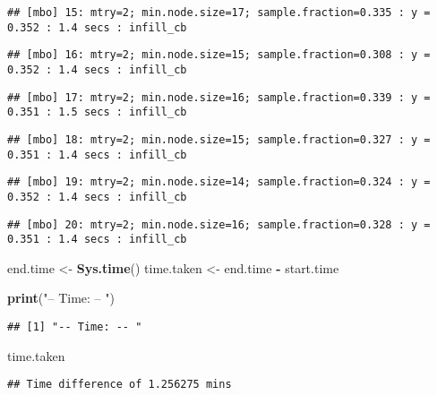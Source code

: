 \documentclass[
]{article}
\newenvironment{Shaded}{\begin{snugshade}}{\end{snugshade}}
\newcommand{\KeywordTok}[1]{\textcolor[rgb]{0.13,0.29,0.53}{\textbf{#1}}}
\newcommand{\NormalTok}[1]{#1}
\newcommand{\OperatorTok}[1]{\textcolor[rgb]{0.81,0.36,0.00}{\textbf{#1}}}
\newcommand{\StringTok}[1]{\textcolor[rgb]{0.31,0.60,0.02}{#1}}
\begin{document}
\begin{verbatim}
## [mbo] 15: mtry=2; min.node.size=17; sample.fraction=0.335 : y = 0.352 : 1.4 secs : infill_cb
\end{verbatim}

\begin{verbatim}
## [mbo] 16: mtry=2; min.node.size=15; sample.fraction=0.308 : y = 0.352 : 1.4 secs : infill_cb
\end{verbatim}

\begin{verbatim}
## [mbo] 17: mtry=2; min.node.size=16; sample.fraction=0.339 : y = 0.351 : 1.5 secs : infill_cb
\end{verbatim}

\begin{verbatim}
## [mbo] 18: mtry=2; min.node.size=15; sample.fraction=0.327 : y = 0.351 : 1.4 secs : infill_cb
\end{verbatim}

\begin{verbatim}
## [mbo] 19: mtry=2; min.node.size=14; sample.fraction=0.324 : y = 0.352 : 1.4 secs : infill_cb
\end{verbatim}

\begin{verbatim}
## [mbo] 20: mtry=2; min.node.size=16; sample.fraction=0.328 : y = 0.351 : 1.4 secs : infill_cb
\end{verbatim}

\begin{Shaded}
\begin{Highlighting}[]
\NormalTok{end.time <-}\StringTok{ }\KeywordTok{Sys.time}\NormalTok{()}
\NormalTok{time.taken <-}\StringTok{ }\NormalTok{end.time }\OperatorTok{-}\StringTok{ }\NormalTok{start.time}

\KeywordTok{print}\NormalTok{(}\StringTok{"-- Time: -- "}\NormalTok{)}
\end{Highlighting}
\end{Shaded}

\begin{verbatim}
## [1] "-- Time: -- "
\end{verbatim}

\begin{Shaded}
\begin{Highlighting}[]
\NormalTok{time.taken}
\end{Highlighting}
\end{Shaded}

\begin{verbatim}
## Time difference of 1.256275 mins
\end{verbatim}
\end{document}
